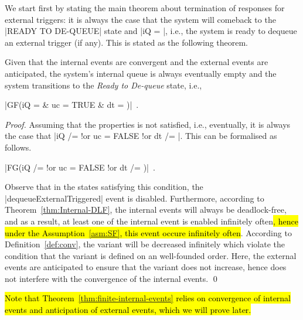 We start first by stating the main theorem about termination of
responses for external triggers: it is always the case that the system
will comeback to the |READY TO DE-QUEUE| state and |iQ = {}|, i.e.,
the system is ready to dequeue an external trigger (if any).  This is
stated as the following theorem.
\begin{theorem}
  \label{thm:finite-internal-events}
  Given that the internal events are convergent and the external
  events are anticipated, the system's internal queue is always
  eventually empty and the system transitions to the \emph{Ready to
    De-queue} state, i.e.,
  \begin{center}
    |GF(iQ = {} & uc = TRUE & dt = {})|~.
  \end{center}
\end{theorem}
\begin{proof}
  Assuming that the properties is not satisfied, i.e., eventually,
  it is always the case that %
  |iQ /= {} !or  uc = FALSE !or dt /=  {}|.  %
  This can be formalised as follows.
  \begin{center}
    |FG(iQ /= {} !or uc = FALSE !or dt /= {})|~.    
  \end{center}
  Observe that in the states satisfying this condition, the
  |dequeueExternalTriggered| event is disabled.  Furthermore,
  according to Theorem~\ref{thm:Internal-DLF}, the internal events
  will always be deadlock-free, and as a result, at least one of the
  internal event is enabled infinitely often\hl{, hence under the
    Assumption~\mbox{\ref{asm:SF}}, this event occure infinitely
    often}. According to Definition~\ref{def:conv}, the variant will
  be decreased infinitely which violate the condition that the variant
  is defined on an well-founded order.  Here, the external events are
  anticipated to ensure that the variant does not increase, hence does
  not interfere with the convergence of the internal events.%
  \qed
\end{proof}
\hl{%
  Note that Theorem~\mbox{\ref{thm:finite-internal-events}} relies on
  convergence of internal events and anticipation of external events,
  which we will prove later.%
}

